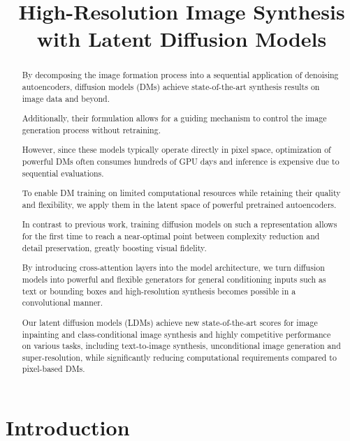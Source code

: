 \title{High-Resolution Image Synthesis with Latent Diffusion Models}

\begin{abstract}
By decomposing the image formation process into a sequential application of denoising autoencoders, diffusion models (DMs) achieve state-of-the-art synthesis results on image data and beyond.

Additionally, their formulation allows for a guiding mechanism to control the image generation process without retraining.

However, since these models typically operate directly in pixel space, optimization of powerful DMs often consumes hundreds of GPU days and inference is expensive due to sequential evaluations.

To enable DM training on limited computational resources while retaining their quality and flexibility, we apply them in the latent space of powerful pretrained autoencoders.

In contrast to previous work, training diffusion models on such a representation allows for the first time to reach a near-optimal point between complexity reduction and detail preservation, greatly boosting visual fidelity.

By introducing cross-attention layers into the model architecture, we turn diffusion models into powerful and flexible generators for general conditioning inputs such as text or bounding boxes and high-resolution synthesis becomes possible in a convolutional manner.

Our latent diffusion models (LDMs) achieve new state-of-the-art scores for image inpainting and class-conditional image synthesis and highly competitive performance on various tasks, including text-to-image synthesis, unconditional image generation and super-resolution, while significantly reducing computational requirements compared to pixel-based DMs.
\end{abstract}

\section{Introduction}

\label{sec:intro}
\enlargethispage{\baselineskip}

